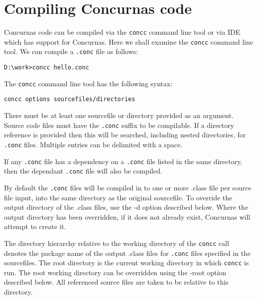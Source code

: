 \documentclass[conc-doc]{subfiles}
\begin{document}
	\chapter[Compiling Concurnas code]{Compiling Concurnas code}
	\label{ch:concc}
	

Concurnas code can be compiled via the \lstinline[language=None]{concc} command line tool or via IDE which has support for Concurnas. Here we shall examine the \lstinline[language=None]{concc} command line tool. We can compile a \lstinline[language=None]{.conc} file as follows:

\begin{lstlisting}[language=None]
D:\work>concc hello.conc
\end{lstlisting}

The \lstinline[language=None]{concc} command line tool has the following syntax:

\begin{center}
\lstinline[language=None]{concc options sourcefiles/directories}
\end{center}

There must be at least one sourcefile or directory provided as an argument. Source code files must have the \lstinline[language=None]{.conc} suffix to be compilable. If a directory reference is provided then this will be searched, including nested directories, for \lstinline[language=None]{.conc} files. Multiple entries can be delimited with a space.

If any \lstinline[language=None]{.conc} file has a dependency on a \lstinline[language=None]{.conc} file listed in the same directory, then the dependant \lstinline[language=None]{.conc} file will also be compiled.

By default the \lstinline[language=None]{.conc} files will be compiled in to one or more .class file per source file input, into the same directory as the original sourcefile. To override the output directory of the .class files, use the -d option described below. Where the output directory has been overridden, if it does not already exist, Concurnas will attempt to create it.

The directory hierarchy relative to the working directory of the \lstinline[language=None]{concc} call denotes the package name of the output .class files for \lstinline[language=None]{.conc} files specified in the sourcefiles. The root directory is the current working directory in which \lstinline[language=None]{concc} is run. The root working directory can be overridden using the -root option described below. All referenced source files are taken to be relative to this directory.
\end{document}
